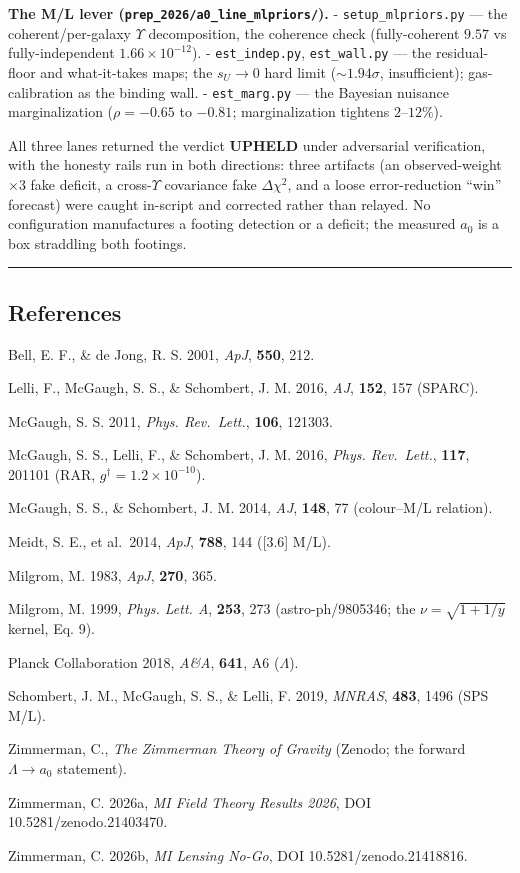 \documentclass[
]{article}
\begin{document}
\textbf{The M/L lever (\texttt{prep\_2026/a0\_line\_mlpriors/}).} -
\texttt{setup\_mlpriors.py} --- the coherent/per-galaxy \(\Upsilon\)
decomposition, the coherence check (fully-coherent \(9.57\) vs
fully-independent \(1.66\times10^{-12}\)). - \texttt{est\_indep.py},
\texttt{est\_wall.py} --- the residual-floor and what-it-takes maps; the
\(s_U\to0\) hard limit (\(\sim1.94\sigma\), insufficient);
gas-calibration as the binding wall. - \texttt{est\_marg.py} --- the
Bayesian nuisance marginalization (\(\rho=-0.65\) to \(-0.81\);
marginalization tightens \(2\)--\(12\%\)).

All three lanes returned the verdict \textbf{UPHELD} under adversarial
verification, with the honesty rails run in both directions: three
artifacts (an observed-weight \(\times3\) fake deficit, a
cross-\(\Upsilon\) covariance fake \(\Delta\chi^2\), and a loose
error-reduction ``win'' forecast) were caught in-script and corrected
rather than relayed. No configuration manufactures a footing detection
or a deficit; the measured \(a_0\) is a box straddling both footings.

\begin{center}\rule{0.5\linewidth}{0.5pt}\end{center}

\subsection{References}\label{references}

Bell, E. F., \& de Jong, R. S. 2001, \emph{ApJ}, \textbf{550}, 212.

Lelli, F., McGaugh, S. S., \& Schombert, J. M. 2016, \emph{AJ},
\textbf{152}, 157 (SPARC).

McGaugh, S. S. 2011, \emph{Phys. Rev.~Lett.}, \textbf{106}, 121303.

McGaugh, S. S., Lelli, F., \& Schombert, J. M. 2016, \emph{Phys.
Rev.~Lett.}, \textbf{117}, 201101 (RAR,
\(g^\dagger=1.2\times10^{-10}\)).

McGaugh, S. S., \& Schombert, J. M. 2014, \emph{AJ}, \textbf{148}, 77
(colour--M/L relation).

Meidt, S. E., et al.~2014, \emph{ApJ}, \textbf{788}, 144 ({[}3.6{]}
M/L).

Milgrom, M. 1983, \emph{ApJ}, \textbf{270}, 365.

Milgrom, M. 1999, \emph{Phys. Lett. A}, \textbf{253}, 273
(astro-ph/9805346; the \(\nu=\sqrt{1+1/y}\) kernel, Eq. 9).

Planck Collaboration 2018, \emph{A\&A}, \textbf{641}, A6 (\(\Lambda\)).

Schombert, J. M., McGaugh, S. S., \& Lelli, F. 2019, \emph{MNRAS},
\textbf{483}, 1496 (SPS M/L).

Zimmerman, C., \emph{The Zimmerman Theory of Gravity} (Zenodo; the
forward \(\Lambda\to a_0\) statement).

Zimmerman, C. 2026a, \emph{MI Field Theory Results 2026}, DOI
10.5281/zenodo.21403470.

Zimmerman, C. 2026b, \emph{MI Lensing No-Go}, DOI
10.5281/zenodo.21418816.
\end{document}
